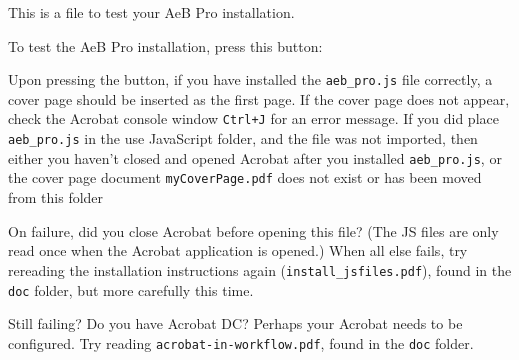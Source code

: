 \documentclass{article}
\begin{document}
This is a file to test your AeB Pro installation.

To test the \textsf{AeB Pro} installation, press this button: 

Upon pressing the button, if you have installed the \texttt{aeb\_pro.js} file
correctly, a cover page should be inserted as the first page. If the cover
page does not appear, check the \textsf{Acrobat} console window
\texttt{Ctrl+J} for an error message. If you did place \texttt{aeb\_pro.js}
in the use JavaScript folder, and the file was not imported, then either you
haven't closed and opened \textsf{Acrobat} after you installed \texttt{aeb\_pro.js},
or the cover page document \texttt{myCoverPage.pdf} does not exist or has
been moved from this folder

On failure, did you close \textsf{Acrobat} before opening this file? (The JS
files are only read once when the \textsf{Acrobat} application is opened.)
When all else fails, try rereading the installation instructions again
(\texttt{install\_jsfiles.pdf}), found in the \texttt{doc} folder, but more
carefully this time.

Still failing? Do you have \textsf{Acrobat DC}? Perhaps your \textsf{Acrobat}
needs to be configured. Try reading \texttt{acrobat-in-workflow.pdf}, found
in the \texttt{doc} folder.
\end{document}
